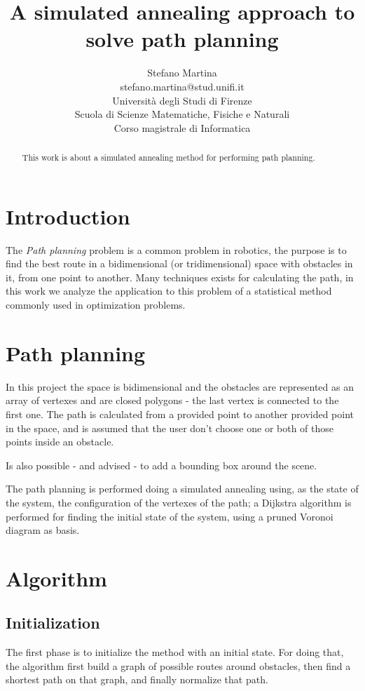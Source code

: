 \documentclass[a4paper]{article}
\author{
  {\Large Stefano Martina}\\
  {\small stefano.martina@stud.unifi.it}\\
  Universit\`a degli Studi di Firenze\\
  Scuola di Scienze Matematiche, Fisiche e Naturali\\
  Corso magistrale di Informatica
}
\title{{\Huge\bfseries A simulated annealing approach to solve path
    planning}}%
\begin{document}
\maketitle
\thispagestyle{empty}
\vfill
\begin{abstract}
  This work is about a simulated annealing method for performing path
  planning.
\end{abstract}

\section{Introduction}
The \emph{Path planning} problem is a common problem in robotics, the
purpose is to find the best route in a bidimensional (or
tridimensional) space with obstacles in it, from one point to
another. Many techniques exists for calculating the path, in this work
we analyze the application to this problem of a statistical method
commonly used in optimization problems.

\section{Path planning}
In this project the space is bidimensional and the obstacles are
represented as an array of vertexes and are closed polygons - the last
vertex is connected to the first one. The path is calculated from a
provided point to another provided point in the space, and is assumed
that the user don't choose one or both of those points inside an
obstacle.

Is also possible - and advised - to add a bounding box around the
scene.

The path planning is performed doing a simulated annealing using, as the state of the system, the
configuration of the vertexes of the path; a Dijkstra algorithm is
performed for finding the initial state of the system, using a pruned 
Voronoi diagram as basis.

\section{Algorithm}
\subsection{Initialization}
The first phase is to initialize the method with an initial state. For
doing that, the algorithm first build a graph of possible routes
around obstacles, then find a shortest path on that graph, and finally
normalize that path.
\end{document}
